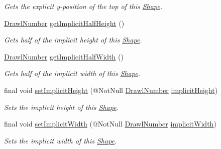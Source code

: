 \begin{DoxyCompactItemize}
\begin{DoxyCompactList}\small\item\em Gets the explicit y-\/position of the top of this \hyperlink{classcom_1_1aarrelaakso_1_1drawl_1_1_shape}{Shape}. \end{DoxyCompactList}\item 
\hyperlink{classcom_1_1aarrelaakso_1_1drawl_1_1_drawl_number}{Drawl\+Number} \hyperlink{classcom_1_1aarrelaakso_1_1drawl_1_1_shape_aa476150489a3a5b634a15a1c03e045d7}{get\+Implicit\+Half\+Height} ()
\begin{DoxyCompactList}\small\item\em Gets half of the implicit height of this \hyperlink{classcom_1_1aarrelaakso_1_1drawl_1_1_shape}{Shape}. \end{DoxyCompactList}\item 
\hyperlink{classcom_1_1aarrelaakso_1_1drawl_1_1_drawl_number}{Drawl\+Number} \hyperlink{classcom_1_1aarrelaakso_1_1drawl_1_1_shape_ac796f934debb4cf92d285f387422deb6}{get\+Implicit\+Half\+Width} ()
\begin{DoxyCompactList}\small\item\em Gets half of the implicit width of this \hyperlink{classcom_1_1aarrelaakso_1_1drawl_1_1_shape}{Shape}. \end{DoxyCompactList}\item 
final void \hyperlink{classcom_1_1aarrelaakso_1_1drawl_1_1_shape_a01a28173688c7c955b0c7558ac3ff5df}{set\+Implicit\+Height} (@Not\+Null \hyperlink{classcom_1_1aarrelaakso_1_1drawl_1_1_drawl_number}{Drawl\+Number} \hyperlink{classcom_1_1aarrelaakso_1_1drawl_1_1_shape_af2f5b1d81ce2cdabc8b18dfb029f413b}{implicit\+Height})
\begin{DoxyCompactList}\small\item\em Sets the implicit height of this \hyperlink{classcom_1_1aarrelaakso_1_1drawl_1_1_shape}{Shape}. \end{DoxyCompactList}\item 
final void \hyperlink{classcom_1_1aarrelaakso_1_1drawl_1_1_shape_ac513970aed7ea7faa1de7efa35d7d068}{set\+Implicit\+Width} (@Not\+Null \hyperlink{classcom_1_1aarrelaakso_1_1drawl_1_1_drawl_number}{Drawl\+Number} \hyperlink{classcom_1_1aarrelaakso_1_1drawl_1_1_shape_a00c6b870d70449a79a000a3374ae041c}{implicit\+Width})
\begin{DoxyCompactList}\small\item\em Sets the implicit width of this \hyperlink{classcom_1_1aarrelaakso_1_1drawl_1_1_shape}{Shape}. \end{DoxyCompactList}\item 

\end{DoxyCompactItemize}
